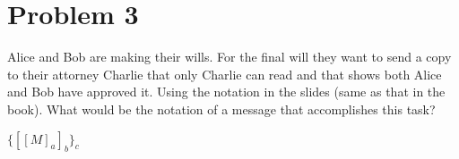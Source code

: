 \documentclass{article}
\newenvironment{problem}[1]{
  \nobreak\section*{Problem #1}
}{}
\begin{document}
  \break

  \begin{problem}{3}
    Alice and Bob are making their wills.  For the final will they want to send a 
    copy to their attorney Charlie that only Charlie can read and that shows both 
    Alice and Bob have approved it.  Using the notation in the slides (same as 
    that in the book).  What would be the notation of a message that accomplishes 
    this task?
  
    \begin{center}
      \begin{math}
        \{[[M]_a]_b\}_c
      \end{math}
    \end{center}
  \end{problem}
\end{document}
